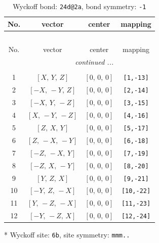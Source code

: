 \documentclass[fleqn,8pt]{jsarticle}
\begin{document}
\renewcommand{\arraystretch}{1.2}
\begin{longtable}{cccc}
\caption{Wyckoff bond: {\tt 24d@2a}, bond symmetry: {\tt -1}}
 \\
 \hline \hline
No. & vector & center & mapping \\ \hline \endfirsthead

\multicolumn{3}{l}{\tablename\ \thetable{}} \\
 \hline \hline
No. & vector & center & mapping \\ \hline \endhead

 \hline \hline
\multicolumn{3}{r}{\footnotesize\it continued ...} \\ \endfoot

 \hline \hline
\multicolumn{3}{r}{} \\ \endlastfoot

1 & $\left[ X,\, Y,\, Z \right]$ & $\left[ 0,\, 0,\, 0 \right]$ & {\tt [1,-13]} \\ \hline
2 & $\left[ - X,\, - Y,\, Z \right]$ & $\left[ 0,\, 0,\, 0 \right]$ & {\tt [2,-14]} \\ \hline
3 & $\left[ - X,\, Y,\, - Z \right]$ & $\left[ 0,\, 0,\, 0 \right]$ & {\tt [3,-15]} \\ \hline
4 & $\left[ X,\, - Y,\, - Z \right]$ & $\left[ 0,\, 0,\, 0 \right]$ & {\tt [4,-16]} \\ \hline
5 & $\left[ Z,\, X,\, Y \right]$ & $\left[ 0,\, 0,\, 0 \right]$ & {\tt [5,-17]} \\ \hline
6 & $\left[ Z,\, - X,\, - Y \right]$ & $\left[ 0,\, 0,\, 0 \right]$ & {\tt [6,-18]} \\ \hline
7 & $\left[ - Z,\, - X,\, Y \right]$ & $\left[ 0,\, 0,\, 0 \right]$ & {\tt [7,-19]} \\ \hline
8 & $\left[ - Z,\, X,\, - Y \right]$ & $\left[ 0,\, 0,\, 0 \right]$ & {\tt [8,-20]} \\ \hline
9 & $\left[ Y,\, Z,\, X \right]$ & $\left[ 0,\, 0,\, 0 \right]$ & {\tt [9,-21]} \\ \hline
10 & $\left[ - Y,\, Z,\, - X \right]$ & $\left[ 0,\, 0,\, 0 \right]$ & {\tt [10,-22]} \\ \hline
11 & $\left[ Y,\, - Z,\, - X \right]$ & $\left[ 0,\, 0,\, 0 \right]$ & {\tt [11,-23]} \\ \hline
12 & $\left[ - Y,\, - Z,\, X \right]$ & $\left[ 0,\, 0,\, 0 \right]$ & {\tt [12,-24]} \\
\end{longtable}
* Wyckoff site: {\tt 6b}, site symmetry: {\tt mmm..}
\renewcommand{\arraystretch}{1.2}
\end{document}
